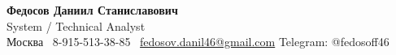 \documentclass[9pt,a4paper]{article}
\begin{document}
\begin{tcolorbox}[
  colback=primary,
  colframe=primary,
  boxrule=0pt,
  arc=8pt,
  left=10pt,right=10pt,top=10pt,bottom=10pt
]
{\color{white}\Huge\textbf{Федосов Даниил Станиславович}}\\[-2pt]
{\color{white}\large System / Technical Analyst}\\[6pt]
{\color{white}
Москва \quad
\faPhone\ 8-915-513-38-85 \quad
\faEnvelope\ \href{mailto:fedosov.danil46@gmail.com}{fedosov.danil46@gmail.com} \quad
Telegram: @fedosoff46
}
\end{tcolorbox}

\vspace{8pt}

\end{document}
